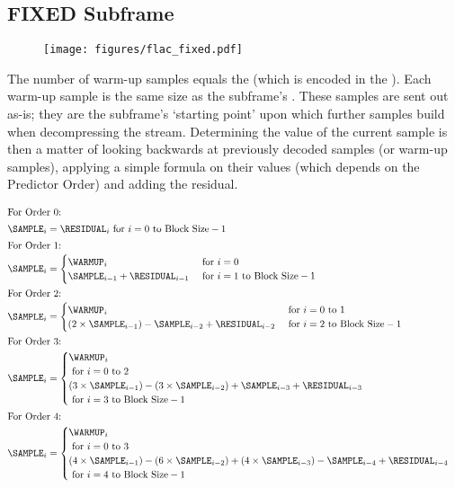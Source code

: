 \subsection{FIXED Subframe}

\begin{figure}[h]
\texttt{[image: figures/flac\_fixed.pdf]}
\end{figure}
\noindent
The number of warm-up samples equals the 
(which is encoded in the ).
Each warm-up sample is the same size as the subframe's
.
These samples are sent out as-is; they are the subframe's
`starting point' upon which further samples build when decompressing
the stream.
Determining the value of the current sample is then a matter of
looking backwards at previously decoded samples (or warm-up samples),
applying a simple formula on their values (which depends on the
Predictor Order) and adding the residual.

\clearpage

\begin{align*}
\intertext{For Order 0:}
\SAMPLE_i &= \RESIDUAL_i \text{ for } i = 0 \text{ to Block Size} - 1 \\
\intertext{For Order 1:}
\SAMPLE_i &=
\begin{cases}
\WARMUP_i & \text{ for } i = 0 \\
\SAMPLE_{i - 1} + \RESIDUAL_{i - 1} & \text{ for } i = 1 \text{ to Block Size} - 1
\end{cases} \\
\intertext{For Order 2:}
\SAMPLE_i &=
\begin{cases}
\WARMUP_i & \text{ for } i = 0 \text{ to } 1 \\
( 2 \times \SAMPLE_{i - 1} ) - \SAMPLE_{i - 2} + \RESIDUAL_{i - 2} & \text{ for } i = 2 \text{ to Block Size} - 1
\end{cases} \\
\intertext{For Order 3:}
\SAMPLE_i &=
\begin{cases}
\WARMUP_i \\
\text{ for } i = 0 \text{ to } 2 \\
( 3 \times \SAMPLE_{i - 1} ) - ( 3 \times \SAMPLE_{i - 2} ) + \SAMPLE_{i - 3} + \RESIDUAL_{i - 3} \\
\text{ for } i = 3 \text{ to Block Size} - 1
\end{cases} \\
\intertext{For Order 4:}
\SAMPLE_i &=
\begin{cases}
\WARMUP_i \\
\text{ for } i = 0 \text{ to } 3 \\
( 4 \times \SAMPLE_{i - 1} ) - ( 6 \times \SAMPLE_{i - 2} ) + (4 \times \SAMPLE_{i - 3} ) - \SAMPLE_{i - 4} + \RESIDUAL_{i - 4} \\
\text{ for } i = 4 \text{ to Block Size} - 1
\end{cases}
\end{align*}

